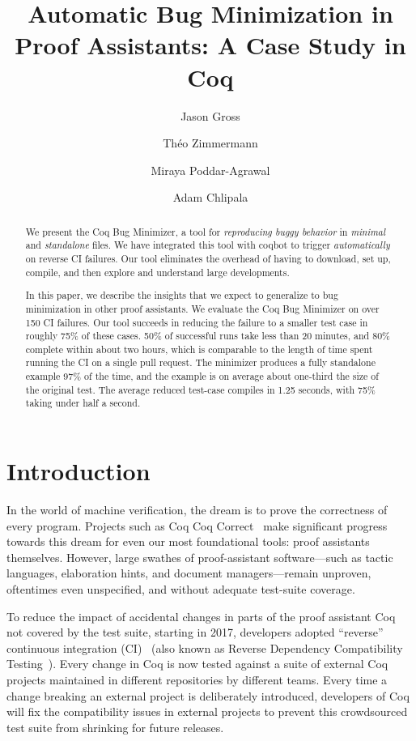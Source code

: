 \documentclass[a4paper,USenglish,cleveref,autoref,thm-restate]{lipics-v2021}
\title{Automatic Bug Minimization in Proof Assistants: A Case Study in Coq}
\author{Jason Gross}{CSAIL, Massachusetts Institute of Technology, 77 Massachusetts Ave., Cambridge, MA 02139, USA \and MIRI, USA \and \url{https://jasongross.github.io/} }{jgross@mit.edu}{https://orcid.org/0000-0002-9427-4891}{}%
\author{Théo Zimmermann}{Inria, Université de Paris, CNRS, IRIF, F-75013, Paris, France \and \url{https://www.theozimmermann.net} }{theo@irif.fr}{https://orcid.org/0000-0002-3580-8806}{}
\author{Miraya Poddar-Agrawal}{Reed College, 3203 SE Woodstock Blvd, Portland, OR 97202, USA%
}{ragrawal@reed.edu}{https://orcid.org/0000-0001-7617-9180}{}
\author{Adam Chlipala}{CSAIL, Massachusetts Institute of Technology, 77 Massachusetts Ave., Cambridge, MA 02139, USA \and \url{http://adam.chlipala.net/} }{adamc@csail.mit.edu}{https://orcid.org/0000-0001-7085-9417}{}
\begin{document}
\maketitle

\begin{abstract}
  We present the Coq Bug Minimizer, a tool for \emph{reproducing buggy behavior} in \emph{minimal} and \emph{standalone} files.
  We have integrated this tool with coqbot to trigger \emph{automatically} on reverse CI failures.
  Our tool eliminates the overhead of having to download, set up, compile, and then explore and understand large developments.

  In this paper, we describe the insights that we expect to generalize to bug minimization in other proof assistants.
  We evaluate the Coq Bug Minimizer on over 150 CI failures.
  Our tool succeeds in reducing the failure to a smaller test case in roughly 75\% of these cases.
  50\% of successful runs take less than 20 minutes, and 80\% complete within about two hours, which is comparable to the length of time spent running the CI on a single pull request.
  The minimizer produces a fully standalone example 97\% of the time, and the example is on average about one-third the size of the original test.
  The average reduced test-case compiles in 1.25 seconds, with 75\% taking under half a second.
\end{abstract}

\section{Introduction}

In the world of machine verification, the dream is to prove the correctness of every program.
Projects such as Coq Coq Correct~\cite{coq-coq-correct} make significant progress towards this dream for even our most foundational tools: proof assistants themselves.
However, large swathes of proof-assistant software—such as tactic languages, elaboration hints, and document managers—remain unproven, oftentimes even unspecified, and without adequate test-suite coverage.


To reduce the impact of accidental changes in parts of the proof assistant Coq not covered by the test suite, starting in 2017, developers adopted ``reverse'' continuous integration (CI)~\cite{zimmermann:tel-02451322} (also known as Reverse Dependency Compatibility Testing~\cite{ochoa2022breakbot}).
Every change in Coq is now tested against a suite of external Coq projects maintained in different repositories by different teams.
Every time a change breaking an external project is deliberately introduced, developers of Coq will fix the compatibility issues in external projects to prevent this crowdsourced test suite from shrinking for future releases.
\end{document}
